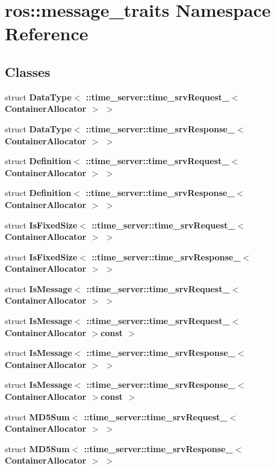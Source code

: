 \section{ros\-:\-:message\-\_\-traits \-Namespace \-Reference}
\label{namespaceros_1_1message__traits}
\subsection*{\-Classes}
\begin{DoxyCompactItemize}
\item 
struct {\bf \-Data\-Type$<$ \-::time\-\_\-server\-::time\-\_\-srv\-Request\-\_\-$<$ Container\-Allocator $>$ $>$}
\item 
struct {\bf \-Data\-Type$<$ \-::time\-\_\-server\-::time\-\_\-srv\-Response\-\_\-$<$ Container\-Allocator $>$ $>$}
\item 
struct {\bf \-Definition$<$ \-::time\-\_\-server\-::time\-\_\-srv\-Request\-\_\-$<$ Container\-Allocator $>$ $>$}
\item 
struct {\bf \-Definition$<$ \-::time\-\_\-server\-::time\-\_\-srv\-Response\-\_\-$<$ Container\-Allocator $>$ $>$}
\item 
struct {\bf \-Is\-Fixed\-Size$<$ \-::time\-\_\-server\-::time\-\_\-srv\-Request\-\_\-$<$ Container\-Allocator $>$ $>$}
\item 
struct {\bf \-Is\-Fixed\-Size$<$ \-::time\-\_\-server\-::time\-\_\-srv\-Response\-\_\-$<$ Container\-Allocator $>$ $>$}
\item 
struct {\bf \-Is\-Message$<$ \-::time\-\_\-server\-::time\-\_\-srv\-Request\-\_\-$<$ Container\-Allocator $>$ $>$}
\item 
struct {\bf \-Is\-Message$<$ \-::time\-\_\-server\-::time\-\_\-srv\-Request\-\_\-$<$ Container\-Allocator $>$const  $>$}
\item 
struct {\bf \-Is\-Message$<$ \-::time\-\_\-server\-::time\-\_\-srv\-Response\-\_\-$<$ Container\-Allocator $>$ $>$}
\item 
struct {\bf \-Is\-Message$<$ \-::time\-\_\-server\-::time\-\_\-srv\-Response\-\_\-$<$ Container\-Allocator $>$const  $>$}
\item 
struct {\bf \-M\-D5\-Sum$<$ \-::time\-\_\-server\-::time\-\_\-srv\-Request\-\_\-$<$ Container\-Allocator $>$ $>$}
\item 
struct {\bf \-M\-D5\-Sum$<$ \-::time\-\_\-server\-::time\-\_\-srv\-Response\-\_\-$<$ Container\-Allocator $>$ $>$}
\end{DoxyCompactItemize}
